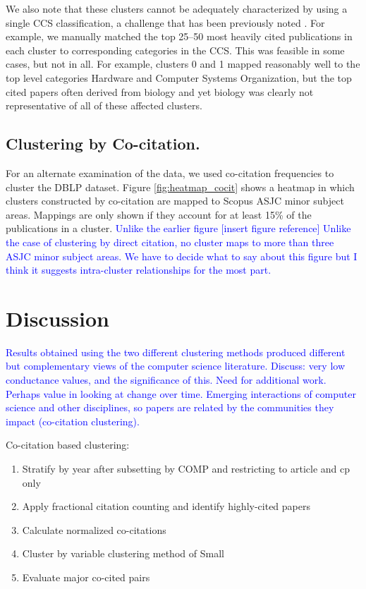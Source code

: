 We also note that these clusters cannot be adequately characterized by using a single CCS classification, a challenge that has been previously noted \cite{waltman_new_2012}.
For example, we
manually matched the top 25--50 most heavily cited publications in each cluster to corresponding categories in the CCS. This was feasible in some cases, but not in all. For example, clusters 0 and 1 mapped reasonably well to the top level categories Hardware and Computer Systems Organization,  but 
the top cited papers often derived from biology and yet biology was clearly not  representative of all of these affected clusters.


\subsection{Clustering by Co-citation.} For an alternate examination of the data, we used co-citation frequencies to cluster the DBLP dataset. 
Figure \ref{fig:heatmap_cocit} shows a heatmap in which clusters constructed by co-citation are mapped to Scopus ASJC minor subject areas. Mappings are only shown if they account for at least 15\% of the publications in a cluster. 
\textcolor{blue}{
Unlike the earlier figure [insert figure reference] Unlike the case of clustering by direct citation, no cluster maps to more than three ASJC minor subject areas. We have to decide what to say about this figure but I think it suggests intra-cluster relationships for the most part. }


\section{Discussion}
\textcolor{blue}{
Results obtained using the two different clustering methods produced different but complementary views of the computer
science literature.
Discuss: very low conductance values, and the significance of this. 
Need for additional work. 
Perhaps value in looking at change over time.
Emerging interactions of computer science and other disciplines, 
so papers are related by the communities they impact (co-citation clustering).
 }

Co-citation based clustering:
\begin{enumerate}
\item Stratify by year after subsetting by COMP and restricting to article and cp only
\item Apply fractional citation counting and identify highly-cited papers
\item Calculate normalized co-citations
\item Cluster by variable clustering method of Small
\item Evaluate major co-cited pairs
\end{enumerate}


